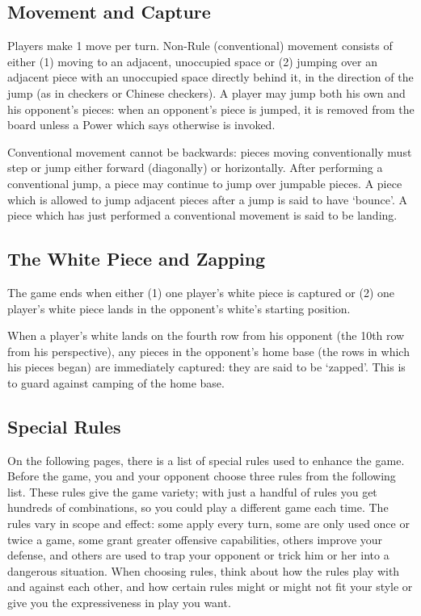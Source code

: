 \documentclass[../rulebook.tex]{subfiles}
\begin{document}
\subsection*{Movement and Capture}
Players make 1 move per turn.
Non-Rule (conventional) movement consists of either
(1) moving to an adjacent, unoccupied space or
(2) jumping over an adjacent piece with an unoccupied
space directly behind it, in the direction of the jump
(as in checkers or Chinese checkers).
A player may jump both his own and his opponent's pieces:
when an opponent's piece is jumped, it is removed from the board
unless a Power which says otherwise is invoked.

Conventional movement cannot be backwards:
pieces moving conventionally must step or jump either forward
(diagonally) or horizontally.
After performing a conventional jump,
a piece may continue to jump over jumpable pieces.
A piece which is allowed to jump adjacent pieces after a jump
is said to have `bounce'.
A piece which has just performed a conventional movement
is said to be landing.

\subsection*{The White Piece and Zapping}
The game ends when either (1) one player's white piece is captured or
(2) one player's white piece lands in the opponent's
white's starting position.

When a player's white lands on the fourth row from his opponent
(the 10th row from his perspective),
any pieces in the opponent's home base
(the rows in which his pieces began) are immediately captured:
they are said to be `zapped'.
This is to guard against camping of the home base.

\subsection*{Special Rules}
On the following pages, there is a list of special rules used
to enhance the game.
Before the game, you and your opponent choose three rules from the 
following list. 
These rules give the game variety; with just a handful of rules
you get hundreds of combinations, so you could play a different game
each time.
The rules vary in scope and effect: some apply every turn,
some are only used once or twice a game,
some grant greater offensive capabilities,
others improve your defense,
and others are used to trap your opponent or trick him or her
into a dangerous situation.
When choosing rules, think about how the rules play
with and against each other, and how certain rules might or might
not fit your style or give you the expressiveness in play you want.
\end{document}
